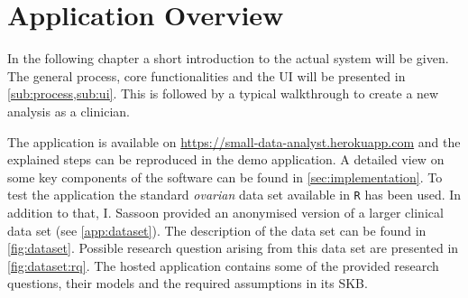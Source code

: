 \section{Application Overview}
\label{sec:app}
In the following chapter a short introduction to the actual system will be given. The general process, core functionalities and the \gls{UI} will be presented in \cref{sub:process,sub:ui}. This is followed by a typical walkthrough to create a new analysis as a clinician. 

The application is available on \href{https://small-data-analyst.herokuapp.com}{https://small-data-analyst.herokuapp.com} and the explained steps can be reproduced in the demo application. A detailed view on some key components of the software can be found in \autoref{sec:implementation}. To test the application the standard \textit{ovarian} data set available in \texttt{R} has been used. In addition to that, I. Sassoon provided an anonymised version of a larger clinical data set (see \autoref{app:dataset}). The description of the data set can be found in \autoref{fig:dataset}. Possible research question arising from this data set are presented in \autoref{fig:dataset:rq}. The hosted application contains some of the provided research questions, their models and the required assumptions in its \gls{SKB}.









